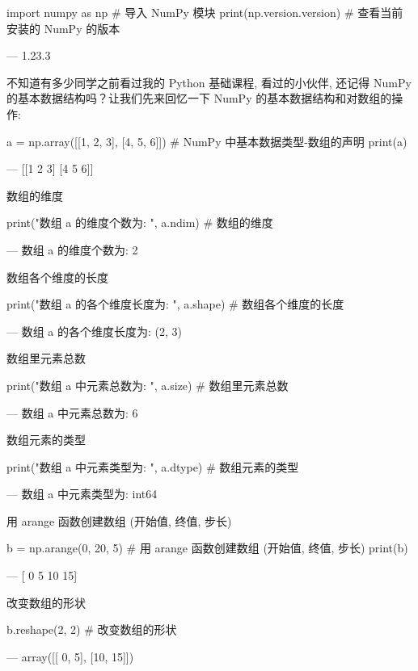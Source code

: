 \begin{python}
import numpy as np    # 导入 NumPy 模块
print(np.version.version)   # 查看当前安装的 NumPy 的版本

---
1.23.3
\end{python}

不知道有多少同学之前看过我的 Python 基础课程, 看过的小伙伴, 还记得 NumPy 的基本数据结构吗？让我们先来回忆一下 NumPy 的基本数据结构和对数组的操作: 

\begin{python}
a = np.array([[1, 2, 3], [4, 5, 6]])   # NumPy 中基本数据类型-数组的声明
print(a)

---
[[1 2 3]
 [4 5 6]]
\end{python}

数组的维度

\begin{python}
print("数组 a 的维度个数为: ", a.ndim)  # 数组的维度

---
数组 a 的维度个数为:  2
\end{python}

数组各个维度的长度

\begin{python}
print("数组 a 的各个维度长度为: ", a.shape)  # 数组各个维度的长度

---
数组 a 的各个维度长度为:  (2, 3)
\end{python}

数组里元素总数

\begin{python}
print("数组 a 中元素总数为: ", a.size)  # 数组里元素总数

---
数组 a 中元素总数为:  6
\end{python}

数组元素的类型

\begin{python}
print("数组 a 中元素类型为: ", a.dtype)  # 数组元素的类型

---
数组 a 中元素类型为:  int64
\end{python}

用 arange 函数创建数组 (开始值, 终值, 步长)

\begin{python}
b = np.arange(0, 20, 5)     # 用 arange 函数创建数组 (开始值, 终值, 步长)
print(b)

---
[ 0  5 10 15]
\end{python}

改变数组的形状

\begin{python}
b.reshape(2, 2)         # 改变数组的形状

---
array([[ 0,  5],
       [10, 15]])
\end{python}

